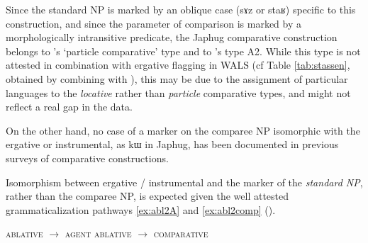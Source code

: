\documentclass[oldfontcommands,oneside,a4paper,11pt]{article}
\newcommand{\ipa}[1]{{\phon #1}} %
\begin{document}
Since the standard NP is marked by an oblique case (\ipa{sɤz} or \ipa{staʁ}) specific to this construction, and since the parameter of comparison is marked by a morphologically intransitive predicate, the Japhug comparative construction belongs to  \citet{stassen11comparative}'s `particle comparative' type and to \citet[789]{dixon08comparative}'s type A2.  While this type is not attested in combination with  ergative flagging in WALS (cf Table \ref{tab:stassen}, obtained by combining \citealt{stassen11comparative} with \citealt{comrie11case}), this may be due to the assignment of particular languages to the \textit{locative} rather than \textit{particle}  comparative types, and might not reflect a real gap in the data.

On the other hand, no case of a marker   on the comparee NP isomorphic with the ergative or instrumental, as \ipa{kɯ} in Japhug, has been documented in   previous surveys of comparative constructions.

\begin{table}[h]
\caption{Combination of chapters 98 (Alignment of Case Marking of Full Nouns) and 121 (Comparative constructions) of the WALS} \label{tab:stassen}
\end{table}
 
Isomorphism between ergative / instrumental and the marker of the \textit{standard NP}, rather than the comparee NP, is expected given the well attested grammaticalization pathways \ref{ex:abl2A} and \ref{ex:abl2comp} (\citealt[29]{heine-kuteva02}).
 


\begin{exe}
\ex \label{ex:abl2A}
\glt \textsc{ablative} $\rightarrow$ \textsc{agent} 
\ex \label{ex:abl2comp}
\glt \textsc{ablative} $\rightarrow$ \textsc{comparative}
\end{exe}
\end{document}
